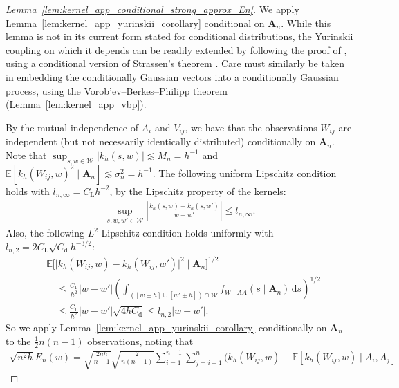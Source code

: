 \documentclass[11pt,lof]{puthesis}
\newcommand{\E}{\ensuremath{\mathbb{E}}}
\newcommand{\rL}{\ensuremath{\mathrm{L}}}
\newcommand{\rd}{\ensuremath{\mathrm{d}}}
\newcommand{\bA}{\ensuremath{\mathbf{A}}}
\newcommand{\cW}{\ensuremath{\mathcal{W}}}
\newcommand{\diff}[1]{\,\mathrm{d}#1}
\theoremstyle{break}
\theoremstyle{proof}
\newtheorem{proof}{Proof}
\begin{document}
\begin{proof}[Lemma~\ref{lem:kernel_app_conditional_strong_approx_En}]

  We apply Lemma~\ref{lem:kernel_app_yurinskii_corollary} conditional on
  $\bA_n$. While this lemma is not in its current form
  stated for conditional distributions,
  the Yurinskii coupling on which it depends can be readily extended
  by following the proof of \citet[Lemma~38]{belloni2019conditional},
  using a conditional version of Strassen's theorem
  \cite[Theorem~B.2]{chen2020jackknife}.
  Care must similarly be taken in embedding the conditionally Gaussian vectors
  into a conditionally Gaussian process, using the
  Vorob'ev--Berkes--Philipp theorem (Lemma~\ref{lem:kernel_app_vbp}).

  By the mutual independence of $A_i$ and $V_{i j}$,
  we have that the observations
  $W_{i j}$ are independent
  (but not necessarily identically distributed)
  conditionally on $\bA_n$.
  Note that
  $\sup_{s,w \in \cW} |k_h(s,w)| \lesssim M_n = h^{-1}$
  and
  $\E[k_h(W_{i j},w)^2 \mid \bA_n] \lesssim \sigma_n^2 = h^{-1}$.
  The following uniform Lipschitz condition holds
  with $l_{n,\infty} = C_\rL h^{-2}$,
  by the Lipschitz property of the kernels:
  \begin{align*}
    \sup_{s,w,w' \in \cW}
    \left|
    \frac{k_h(s, w) - k_h(s, w')}
    {w-w'}
    \right|
    \leq
    l_{n,\infty}.
  \end{align*}
  Also, the following $L^2$ Lipschitz condition holds
  uniformly with $l_{n,2} = 2 C_\rL \sqrt{C_\rd} h^{-3/2}$:
  \begin{align*}
    &\E\big[
      \big|
      k_h(W_{i j}, w) - k_h(W_{i j}, w')
      \big|^2
      \mid \bA_n
    \big]^{1/2} \\
    &\quad\leq
    \frac{C_\rL}{h^2}
    |w-w'|
    \left(
      \int_{([w \pm h] \cup [w' \pm h]) \cap \cW}
      f_{W \mid AA}(s \mid \bA_n)
      \diff{s}
    \right)^{1/2} \\
    &\quad\leq
    \frac{C_\rL}{h^2}
    |w-w'|
    \sqrt{4h C_\rd}
    \leq
    l_{n,2}
    |w-w'|.
  \end{align*}
  So we apply
  Lemma~\ref{lem:kernel_app_yurinskii_corollary}
  conditionally on $\bA_n$
  to the $\frac{1}{2}n(n-1)$ observations,
  noting that
  \begin{align*}
    \sqrt{n^2h} E_n(w)
    =
    \sqrt{\frac{2 n h}{n-1}}
    \sqrt{\frac{2}{n(n-1)}}
    \sum_{i=1}^{n-1}
    \sum_{j=i+1}^{n}
    \Big(
      k_h(W_{i j},w)
      - \E[k_h(W_{i j},w) \mid A_i, A_j]

\end{align*}
\end{proof}
\end{document}
